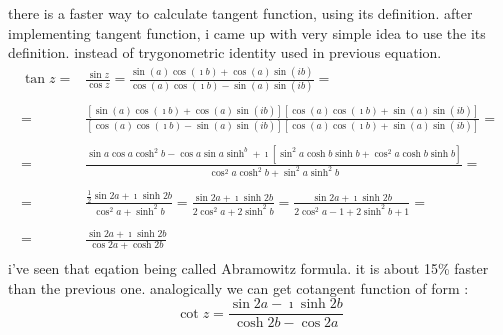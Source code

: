 \documentclass[11pt,a4paper,openany,oneside]{extreport}
\begin{document}
there is a faster way to calculate tangent function, using its definition. 
after implementing tangent function, i came up with very simple idea to use the its definition. instead
of trygonometric identity used in previous equation. 
 \begin{displaymath}
  \begin{array}{rl}
  \tan{z} = &\frac{\sin{z}}{\cos{z}} = \frac{\sin{(a)}\cos{(\imath b)} + \cos{(a)}\sin{(ib)}}{\cos{(a)}\cos{(\imath b)} - \sin{(a)}\sin{(ib)}} = \\
   \ & \ \\
   = & \frac{\left[\sin{(a)}\cos{(\imath b)} + \cos{(a)}\sin{(ib)}\right]\left[ \cos{(a)}\cos{(\imath b)} + \sin{(a)}\sin{(ib)} \right]}{ \left[ \cos{(a)}\cos{(\imath b)} - \sin{(a)}\sin{(ib)} \right]\left[ \cos{(a)}\cos{(\imath b)} + \sin{(a)}\sin{(ib)} \right] } =\\
   \ & \ \\
   = & \frac{ \sin{a}\cos{a}\cosh^2{b} - \cos{a}\sin{a}\sinh^{b}+\imath\left[ \sin^2{a}\cosh{b}\sinh{b}+\cos^2{a}\cosh{b}\sinh{b} \right]}{ \cos^2{a}\cosh^2{b}+\sin^2{a}\sinh^2{b} }=\\
   \ & \ \\
   = & \frac{ \frac{1}{2} \sin{2a} + \imath \sinh{2b} }{ \cos^2{a}+\sinh^2{b} } = \frac{ \sin{2a} + \imath \sinh{2b} }{ 2\cos^2{a}+2\sinh^2{b} } = \frac{ \sin{2a} + \imath \sinh{2b} }{ 2\cos^2{a}-1 + 2\sinh^2{b}+1 } = \\
   \ & \ \\
   = & \frac{ \sin{2a} + \imath \sinh{2b} }{ \cos{2a} + \cosh{2b} } \\
  \end{array}
 \end{displaymath}
 i've seen that eqation being called Abramowitz formula. it is about 15\% faster than the previous one. analogically we can get cotangent function of form :
 \begin{displaymath}
  \cot{z} = \frac{ \sin{2a} - \imath \sinh{2b} }{ \cosh{2b} - \cos{2a} }
 \end{displaymath}
  
\end{document}
